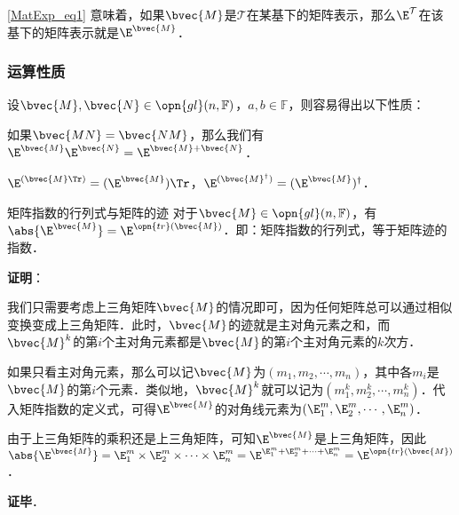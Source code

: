 \autoref{MatExp_eq1} 意味着，如果$\bvec{M}$是$\mathcal{T}$在某基下的矩阵表示，那么$\E^\mathcal{T}$在该基下的矩阵表示就是$\E^{\bvec{M}}$．

\subsubsection{运算性质}

设$\bvec{M}, \bvec{N}\in \opn{gl}(n, \mathbb{F})$，$a, b\in\mathbb{F}$，则容易得出以下性质：

如果$\bvec{MN}=\bvec{NM}$，那么我们有$\E^{\bvec{M}}\E^{\bvec{N}}=\E^{\bvec{M}+\bvec{N}}$．

$\E^{(\bvec{M}\Tr)}=(\E^{\bvec{M}})\Tr$，$\E^{(\bvec{M}^\dagger)}=({\E^{\bvec{M}}})^\dagger$．

\begin{theorem}{矩阵指数的行列式与矩阵的迹}
对于$\bvec{M}\in\opn{gl}(n, \mathbb{F})$，有$\abs{\E^{\bvec{M}}}=\E^{\opn{tr}(\bvec{M})}$．即：矩阵指数的行列式，等于矩阵迹的指数．
\end{theorem}

\textbf{证明}：

我们只需要考虑上三角矩阵$\bvec{M}$的情况即可，因为任何矩阵总可以通过相似变换变成上三角矩阵．此时，$\bvec{M}$的迹就是主对角元素之和，而$\bvec{M}^k$的第$i$个主对角元素都是$\bvec{M}$的第$i$个主对角元素的$k$次方．

如果只看主对角元素，那么可以记$\bvec{M}$为$(m_1, m_2,\cdots,m_n)$，其中各$m_i$是$\bvec{M}$的第$i$个元素．类似地，$\bvec{M}^k$就可以记为$(m_1^k, m_2^k,\cdots,m_n^k)$．代入矩阵指数的定义式，可得$\E^{\bvec{M}}$的对角线元素为$(\E^m_1, \E^m_2,\cdots, \E^m_n)$．

由于上三角矩阵的乘积还是上三角矩阵，可知$\E^{\bvec{M}}$是上三角矩阵，因此$\abs{\E^{\bvec{M}}}=\E^m_1\times\E^m_2\times\cdots\times\E^m_n=\E^{\E^m_1+\E^m_2+\cdots+\E^m_n}=\E^{\opn{tr}(\bvec{M})}$．

\textbf{证毕}．
